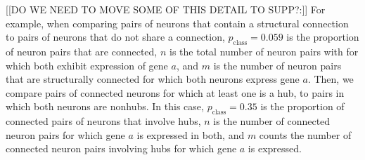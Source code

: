 \documentclass[10pt,letterpaper]{article}
\begin{document}
[[DO WE NEED TO MOVE SOME OF THIS DETAIL TO SUPP?:]]
For example, when comparing pairs of neurons that contain a structural connection to pairs of neurons that do not share a connection, $p_\mathrm{class} = 0.059$ is the proportion of neuron pairs that are connected, $n$ is the total number of neuron pairs with for which both exhibit expression of gene $a$, and $m$ is the number of neuron pairs that are structurally connected for which both neurons express gene $a$.
Then, we compare pairs of connected neurons for which at least one is a hub, to pairs in which both neurons are nonhubs.
In this case, $p_\mathrm{class} = 0.35$ is the proportion of connected pairs of neurons that involve hubs, $n$ is the number of connected neuron pairs for which gene $a$ is expressed in both, and $m$ counts the number of connected neuron pairs involving hubs for which gene $a$ is expressed.
\end{document}
